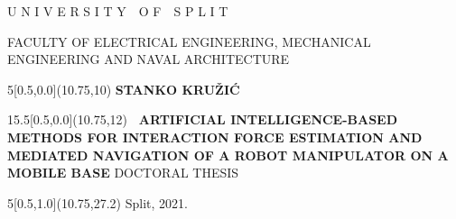 \documentclass[12pt, twoside, onecolumn]{book}
\DeclareRobustCommand{\[}{\begin{equation}}
\DeclareRobustCommand{\]}{\end{equation}}
\begin{document}
\frontmatter \pagestyle{plain}


\begin{titlepage}
\begin{center}
{\fontsize{13}{20}\textnormal{U N I V E R S I T Y~~O F~~S P L I T}}

{\fontsize{13}{20}\textnormal{FACULTY OF ELECTRICAL ENGINEERING, MECHANICAL ENGINEERING AND NAVAL ARCHITECTURE}}
\vskip 60mm
\begin{textblock}{5}[0.5,0.0](10.75,10) \fontsize{14}{20}\bfseries{STANKO KRUŽIĆ} \end{textblock}
\begin{textblock}{15.5}[0.5,0.0](10.75,12)
{\fontsize{18}{26}\bfseries\
ARTIFICIAL INTELLIGENCE-BASED METHODS FOR INTERACTION FORCE ESTIMATION AND MEDIATED NAVIGATION OF A ROBOT MANIPULATOR ON A MOBILE BASE}
\vskip 20mm
{\fontsize{14}{20}\textnormal{DOCTORAL THESIS}}
\end{textblock}
\begin{textblock}{5}[0.5,1.0](10.75,27.2)
{\fontsize{13}{20}\textnormal
Split, 2021.}
\end{textblock}
\newpage
\thispagestyle{empty}
\end{center}
\end{titlepage}

\end{document}
